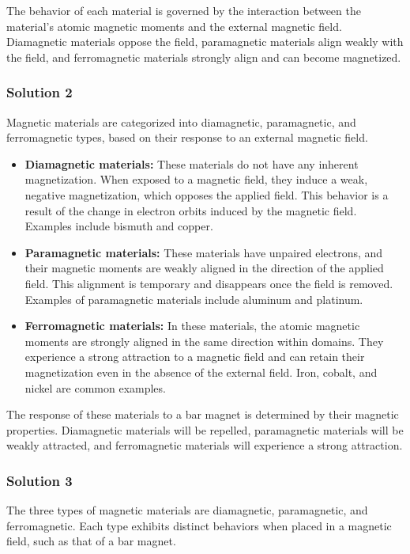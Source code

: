 \documentclass{article}
\begin{document}
The behavior of each material is governed by the interaction between the material's atomic magnetic moments and the external magnetic field. Diamagnetic materials oppose the field, paramagnetic materials align weakly with the field, and ferromagnetic materials strongly align and can become magnetized.

\subsubsection{Solution 2}

Magnetic materials are categorized into diamagnetic, paramagnetic, and ferromagnetic types, based on their response to an external magnetic field.

\begin{itemize}
    \item \textbf{Diamagnetic materials:} These materials do not have any inherent magnetization. When exposed to a magnetic field, they induce a weak, negative magnetization, which opposes the applied field. This behavior is a result of the change in electron orbits induced by the magnetic field. Examples include bismuth and copper.
    \item \textbf{Paramagnetic materials:} These materials have unpaired electrons, and their magnetic moments are weakly aligned in the direction of the applied field. This alignment is temporary and disappears once the field is removed. Examples of paramagnetic materials include aluminum and platinum.
    \item \textbf{Ferromagnetic materials:} In these materials, the atomic magnetic moments are strongly aligned in the same direction within domains. They experience a strong attraction to a magnetic field and can retain their magnetization even in the absence of the external field. Iron, cobalt, and nickel are common examples.
\end{itemize}

The response of these materials to a bar magnet is determined by their magnetic properties. Diamagnetic materials will be repelled, paramagnetic materials will be weakly attracted, and ferromagnetic materials will experience a strong attraction.

\subsubsection{Solution 3}

The three types of magnetic materials are diamagnetic, paramagnetic, and ferromagnetic. Each type exhibits distinct behaviors when placed in a magnetic field, such as that of a bar magnet.
\end{document}
